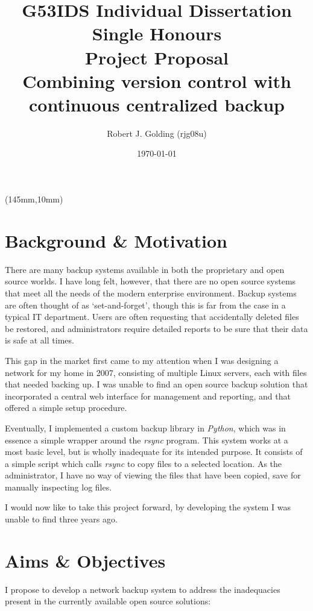 \documentclass[a4paper]{article}
\title{
    \vspace{5cm}
    \huge{G53IDS Individual Dissertation Single Honours} \\[0.5cm]
    \LARGE{Project Proposal} \\[0.5cm]
    \Large{Combining version control with continuous centralized backup} \\[0.2cm]
}
\author{Robert J. Golding (rjg08u)} \date{\today}
\begin{document}
    \begin{textblock*}{60mm}(145mm,10mm)
        
    \end{textblock*}
    \maketitle
    \thispagestyle{empty}
    \newpage

    \section{Background \& Motivation}

    There are many backup systems available in both the proprietary and open
    source worlds. I have long felt, however, that there are no open source
    systems that meet all the needs of the modern enterprise environment.
    Backup systems are often thought of as `set-and-forget', though this is far
    from the case in a typical IT department. Users are often requesting that
    accidentally deleted files be restored, and administrators require detailed
    reports to be sure that their data is safe at all times.

    This gap in the market first came to my attention when I was designing
    a network for my home in 2007, consisting of multiple Linux servers, each
    with files that needed backing up. I was unable to find an open source
    backup solution that incorporated a central web interface for management
    and reporting, and that offered a simple setup procedure.

    Eventually, I implemented a custom backup library in \emph{Python}, which
    was in essence a simple wrapper around the \emph{rsync} program. This
    system works at a most basic level, but is wholly inadequate for its
    intended purpose. It consists of a simple script which calls \emph{rsync}
    to copy files to a selected location. As the administrator, I have no way
    of viewing the files that have been copied, save for manually inspecting
    log files.

    I would now like to take this project forward, by developing the system
    I was unable to find three years ago.

    \section{Aims \& Objectives}

    I propose to develop a network backup system to address the inadequacies
    present in the currently available open source solutions:
\end{document}
